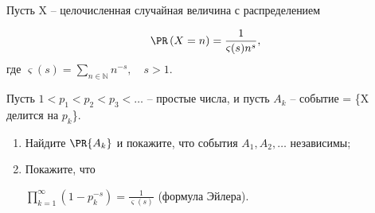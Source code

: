 \begin{problem} 
Пусть X -- 
целочисленная случайная величина с распределением

\[\PR\left( {X=n} \right)=\frac{1}{\varsigma (s)n^s},\;\]
\noindent где $\varsigma 
(s)=\sum\limits_{n\in {\mathbb N}} {n^{-s}} ,\quad s>1$.

Пусть $1<p_1 <p_2 <p_3 <\ldots $ -- простые числа, и пусть $A_k $ -- событие 
= {\{}X делится на $p_k ${\}}.

\begin{enumerate}

\item Найдите $\PR\{A_k \}$ и покажите, что события $A_1 ,A_2 ,\ldots $ 
независимы;

\item Покажите, что
\begin{center}
$\prod\limits_{k=1}^\infty {(1-p_k ^{-s})} =\frac{1}{\varsigma (s)}$ (формула 
Эйлера).
\end{center}

\end{enumerate}
\end{problem}

